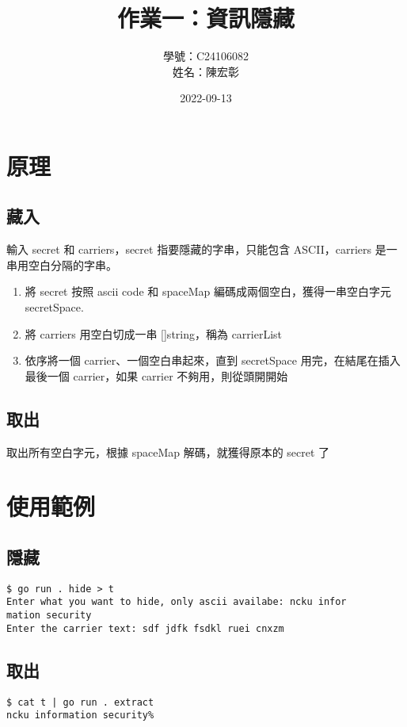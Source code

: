 \documentclass[12pt,a4paper]{article}
\title{作業一：資訊隱藏}
\author{學號：C24106082\\
姓名：陳宏彰}
\date{2022-09-13}
\begin{document}
\maketitle  

\section{原理}
\subsection{藏入}
輸入 secret 和 carriers，secret 指要隱藏的字串，只能包含 ASCII，carriers 是一串用空白分隔的字串。

\begin{enumerate}
    \item 將 secret 按照 ascii code 和 spaceMap 編碼成兩個空白，獲得一串空白字元 secretSpace.
    \item 將 carriers 用空白切成一串 []string，稱為 carrierList
    \item 依序將一個 carrier、一個空白串起來，直到 secretSpace 用完，在結尾在插入最後一個 carrier，如果 carrier 不夠用，則從頭開開始
\end{enumerate}
    
\subsection{取出}
取出所有空白字元，根據 spaceMap 解碼，就獲得原本的 secret 了

\section{使用範例}
\subsection{隱藏}
\begin{lstlisting}
$ go run . hide > t
Enter what you want to hide, only ascii availabe: ncku infor
mation security
Enter the carrier text: sdf jdfk fsdkl ruei cnxzm
\end{lstlisting}

\subsection{取出}
\begin{lstlisting}
$ cat t | go run . extract
ncku information security%
\end{lstlisting}
\end{document}
